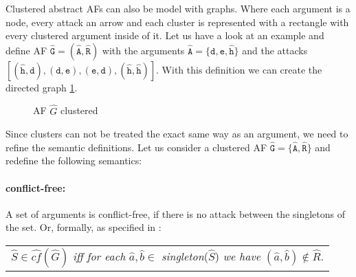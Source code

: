Clustered abstract AFs can also be model with graphs. Where each argument is a node, every attack an arrow and each cluster is represented with a rectangle with every clustered argument inside of it. Let us have a look at an example and define AF $\mathtt{\hat{G}=(\hat{A}, \hat{R})}$ with the arguments $\mathtt{\hat{A}=\{d, e, \hat{h}\}}$ and the attacks $\mathtt{[(\hat{h}, d), (d, e), (e, d), (\hat{h}, \hat{h})]}$. With this definition we can create the directed graph \ref{af:backgroundExampleClusterSpurious}.


\begin{figure}[h]
    \centering
    \caption{\ac{AF} $\hat{G}$ clustered}
    \label{af:backgroundExampleClusterSpurious}
\end{figure}


Since clusters can not be treated the exact same way as an argument, we need to refine the semantic definitions. Let us consider a clustered AF $\mathtt{\hat{G}=\{\hat{A}, \hat{R}\}}$ and redefine the following semantics:
\paragraph{conflict-free:} A set of arguments is conflict-free, if there is no attack between the singletons of the set. Or, formally, as specified in \cite{DBLP:conf/kr/SaribaturW21}:

\begin{center}
    \begin{tabular}{c}
        $\hat{S} \in \hat{cf}(\hat{G})$ \textit{iff for each} $\hat{a}, \hat{b} \in$ \textit{singleton}($\hat{S}$) \textit{we have} $(\hat{a}, \hat{b}) \not\in \hat{R}$.
    \end{tabular}
\end{center}

